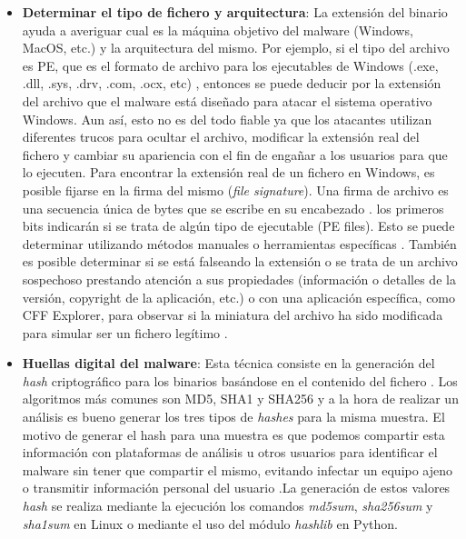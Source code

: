 \begin{itemize}
    \item \textbf{Determinar el tipo de fichero y arquitectura}: La extensión del binario ayuda a averiguar cual es la máquina objetivo del malware (Windows, MacOS, etc.) y la arquitectura del mismo. Por ejemplo, si el tipo del archivo es \gls{PE}, que es el formato de archivo para los ejecutables de Windows (.exe, .dll, .sys, .drv, .com, .ocx, etc) \cite{96}, entonces se puede deducir por la extensión del archivo que el malware está diseñado para atacar el sistema operativo Windows.
    Aun así, esto no es del todo fiable ya que los atacantes utilizan diferentes trucos para ocultar el archivo, modificar la extensión real del fichero y cambiar su apariencia con el fin de engañar a los usuarios para que lo ejecuten.
    Para encontrar la extensión real de un fichero en Windows, es posible fijarse en la firma del mismo (\textit{file signature}). Una firma de archivo es una secuencia única de bytes que se escribe en su encabezado \cite{97}. los primeros bits indicarán si se trata de algún tipo de ejecutable (\gls{PE} files). Esto se puede determinar utilizando métodos manuales o herramientas específicas \cite{LMA2018}. 
    También es posible determinar si se está falseando la extensión o se trata de un archivo sospechoso prestando atención a sus propiedades (información o detalles de la versión, copyright de la aplicación, etc.) o con una aplicación específica, como CFF Explorer, para observar si la miniatura del archivo ha sido modificada para simular ser un fichero legítimo \cite{Mohanta2020}.

    \item \textbf{Huellas digital del malware}: Esta técnica consiste en la generación del \textit{hash} criptográfico para los binarios basándose en el contenido del fichero \cite{LMA2018}. Los algoritmos más comunes son MD5, SHA1 y SHA256 y a la hora de realizar un análisis es bueno generar los tres tipos de \textit{hashes} para la misma muestra. El motivo de generar el hash para una muestra es que podemos compartir esta información con plataformas de análisis u otros usuarios para identificar el malware sin tener que compartir el mismo, evitando infectar un equipo ajeno o transmitir información personal del usuario \cite{Mohanta2020}.La generación de estos valores \textit{hash} se realiza mediante la ejecución los comandos \textit{md5sum}, \textit{sha256sum} y \textit{sha1sum} en Linux o mediante el uso del módulo \textit{hashlib} en Python.



\end{itemize}
